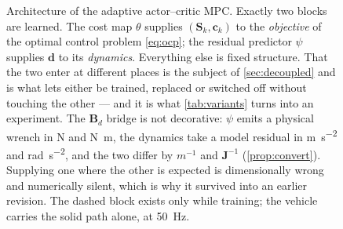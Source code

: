 \documentclass[11pt,a4paper,twoside,openright]{report}
\renewcommand{\vec}[1]{\bm{#1}}
\newcommand{\mat}[1]{\bm{#1}}
\newcommand{\ctrlstate}{\vec{x}}
\newcommand{\inp}{\vec{u}}
\newcommand{\dres}{\vec{d}}
\newcommand{\wrench}{\vec{w}}
\newcommand{\refsym}{\mathrm{ref}}
\theoremstyle{plain}
\theoremstyle{definition}
\theoremstyle{remark}
\begin{document}
\begin{figure}[htbp]
{}
		\caption[Architecture of the adaptive actor--critic MPC]{Architecture of the
			adaptive actor--critic MPC. Exactly two blocks are learned. The cost map
			$\theta$ supplies $(\mat S_k,\vec c_k)$ to the \emph{objective} of the
			optimal control problem \cref{eq:ocp}; the residual predictor $\psi$
			supplies $\dres$ to its \emph{dynamics}. Everything else is fixed
			structure. That the two enter at different places is the subject of
			\cref{sec:decoupled} and is what lets either be trained, replaced or
			switched off without touching the other --- and it is what
			\cref{tab:variants} turns into an experiment. The $\mat B_d$ bridge is not
			decorative: $\psi$ emits a physical wrench in \si{\newton} and
			\si{\newton\metre}, the dynamics take a model residual in
			\si{\metre\per\square\second} and \si{\radian\per\square\second}, and the
			two differ by $m^{-1}$ and $\mat J^{-1}$ (\cref{prop:convert}). Supplying
			one where the other is expected is dimensionally wrong and numerically
			silent, which is why it survived into an earlier revision. The dashed
			block exists only while training; the vehicle carries the solid path
			alone, at \SI{50}{\hertz}.}
		\label{fig:architecture}
	\end{figure}
\end{document}
